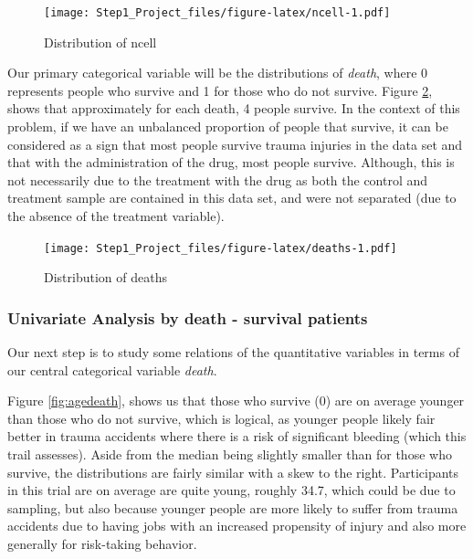 \documentclass[
]{article}
\begin{document}
\begin{figure}
\centering
\texttt{[image: Step1\_Project\_files/figure-latex/ncell-1.pdf]}
\caption{Distribution of ncell\label{fig:ncell}}
\end{figure}

Our primary categorical variable will be the distributions of
\emph{death}, where 0 represents people who survive and 1 for those who
do not survive. Figure \ref{fig:deaths}, shows that approximately for
each death, 4 people survive. In the context of this problem, if we have
an unbalanced proportion of people that survive, it can be considered as
a sign that most people survive trauma injuries in the data set and that
with the administration of the drug, most people survive. Although, this
is not necessarily due to the treatment with the drug as both the
control and treatment sample are contained in this data set, and were
not separated (due to the absence of the treatment variable).

\begin{figure}
\centering
\texttt{[image: Step1\_Project\_files/figure-latex/deaths-1.pdf]}
\caption{Distribution of deaths\label{fig:deaths}}
\end{figure}

\newpage

\hypertarget{univariate-analysis-by-death---survival-patients}{%
\subsubsection{Univariate Analysis by death - survival
patients}\label{univariate-analysis-by-death---survival-patients}}

Our next step is to study some relations of the quantitative variables
in terms of our central categorical variable \emph{death}.

Figure \ref{fig:agedeath}, shows us that those who survive (0) are on
average younger than those who do not survive, which is logical, as
younger people likely fair better in trauma accidents where there is a
risk of significant bleeding (which this trail assesses). Aside from the
median being slightly smaller than for those who survive, the
distributions are fairly similar with a skew to the right. Participants
in this trial are on average are quite young, roughly 34.7, which could
be due to sampling, but also because younger people are more likely to
suffer from trauma accidents due to having jobs with an increased
propensity of injury and also more generally for risk-taking behavior.
\end{document}

